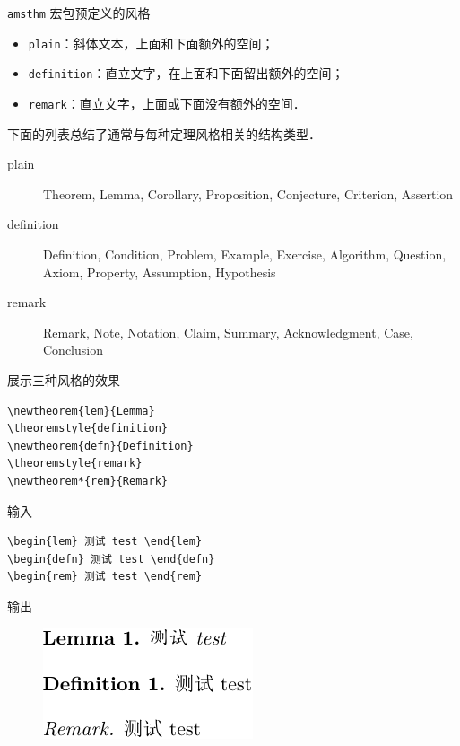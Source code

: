 \documentclass[aspectratio=169,fontset=none]{ctexbeamer}
\newcommand{\pkg}[1]{\texttt{#1}}
\begin{document}
  \begin{frame}[fragile]{\pkg{amsthm} 宏包预定义的风格}
    \begin{itemize}
      \item \texttt{plain}：斜体文本，上面和下面额外的空间；
      \item \texttt{definition}：直立文字，在上面和下面留出额外的空间；
      \item \texttt{remark}：直立文字，上面或下面没有额外的空间．
    \end{itemize}
    下面的列表总结了通常与每种定理风格相关的结构类型．
    \begin{description}
      \item[plain] Theorem, Lemma, Corollary, Proposition, Conjecture, Criterion, Assertion
      \item[definition] Definition, Condition, Problem, Example, Exercise, Algorithm, Question, Axiom, Property, Assumption, Hypothesis
      \item[remark] Remark, Note, Notation, Claim, Summary, Acknowledgment, Case, Conclusion
    \end{description}
  \end{frame}

  \begin{frame}[fragile]{展示三种风格的效果}
    \begin{minipage}{\textwidth}
    \begin{verbatim}
\newtheorem{lem}{Lemma}
\theoremstyle{definition}
\newtheorem{defn}{Definition}
\theoremstyle{remark}
\newtheorem*{rem}{Remark}
    \end{verbatim}
    \end{minipage}
    \vskip 5pt
    \begin{minipage}[t]{0.6\textwidth}
    输入
    \begin{verbatim}
\begin{lem} 测试 test \end{lem}
\begin{defn} 测试 test \end{defn}
\begin{rem} 测试 test \end{rem}
    \end{verbatim}
    \end{minipage}%
    \begin{minipage}[t]{0.4\textwidth}
    输出
      \begin{figure}
        \centering
        \includegraphics{material/三种定理风格.pdf}
      \end{figure}
    \end{minipage}
  \end{frame}
\end{document}
